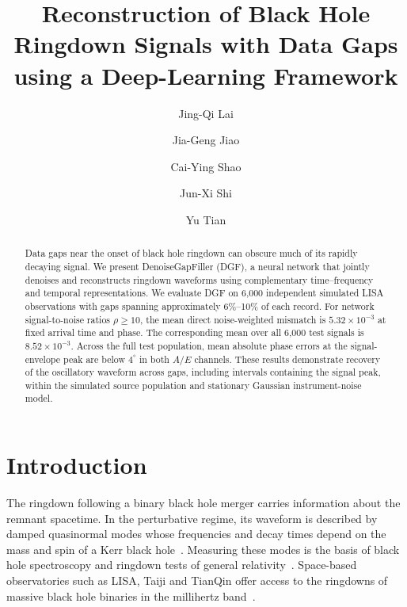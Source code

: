 \documentclass[10pt,prd,aps,a4paper,twocolumn,superscriptaddress,nofootinbib,floatfix]{revtex4-2}
\begin{document}
\title{Reconstruction of Black Hole Ringdown Signals with Data Gaps using a Deep-Learning Framework}
\author{Jing-Qi Lai}
\author{Jia-Geng Jiao}
\author{Cai-Ying Shao}

\author{Jun-Xi Shi}
\author{Yu Tian}

\begin{abstract}
Data gaps near the onset of black hole ringdown can obscure much of its rapidly decaying signal. We present DenoiseGapFiller (DGF), a neural network that jointly denoises and reconstructs ringdown waveforms using complementary time--frequency and temporal representations. We evaluate DGF on 6,000 independent simulated LISA observations with gaps spanning approximately 6\%--10\% of each record. For network signal-to-noise ratios $\rho\ge10$, the mean direct noise-weighted mismatch is $5.32\times10^{-3}$ at fixed arrival time and phase. The corresponding mean over all 6,000 test signals is $8.52\times10^{-3}$. Across the full test population, mean absolute phase errors at the signal-envelope peak are below $4^\circ$ in both $A/E$ channels. These results demonstrate recovery of the oscillatory waveform across gaps, including intervals containing the signal peak, within the simulated source population and stationary Gaussian instrument-noise model.
\end{abstract}

\maketitle
\section{Introduction}
The ringdown following a binary black hole merger carries information about the remnant spacetime. In the perturbative regime, its waveform is described by damped quasinormal modes whose frequencies and decay times depend on the mass and spin of a Kerr black hole~\cite{berti2006gravitational,berti2009qnm}. Measuring these modes is the basis of black hole spectroscopy and ringdown tests of general relativity~\cite{Isi_2019}. Space-based observatories such as LISA, Taiji and TianQin offer access to the ringdowns of massive black hole binaries in the millihertz band~\cite{amaroseoane2017laserinterferometerspaceantenna,robson2019construction,Ruan2020,Luo2016}.
\end{document}
